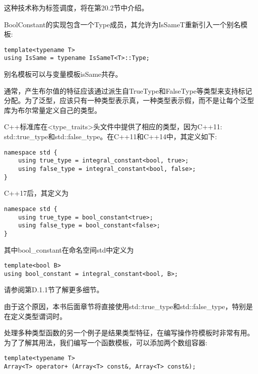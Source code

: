 这种技术称为标签调度，将在第20.2节中介绍。

BoolConstant的实现包含一个Type成员，其允许为IsSameT重新引入一个别名模板:

\begin{lstlisting}[style=styleCXX]
template<typename T>
using IsSame = typename IsSameT<T>::Type;
\end{lstlisting}

别名模板可以与变量模板isSame共存。

通常，产生布尔值的特征应该通过派生自TrueType和FalseType等类型来支持标记分配。为了泛型，应该只有一种类型表示真，一种类型表示假，而不是让每个泛型库为布尔常量定义自己的类型。

C++标准库在<type\_traits>头文件中提供了相应的类型，因为C++11: std::true\_type和std::false\_type。在C++11和C++14中，其定义如下:

\begin{lstlisting}[style=styleCXX]
namespace std {
	using true_type = integral_constant<bool, true>;
	using false_type = integral_constant<bool, false>;
}
\end{lstlisting}

C++17后，其定义为

\begin{lstlisting}[style=styleCXX]
namespace std {
	using true_type = bool_constant<true>;
	using false_type = bool_constant<false>;
}
\end{lstlisting}

其中bool\_constant在命名空间std中定义为

\begin{lstlisting}[style=styleCXX]
template<bool B>
using bool_constant = integral_constant<bool, B>;
\end{lstlisting}

请参阅第D.1.1节了解更多细节。

由于这个原因，本书后面章节将直接使用std::true\_type和std::false\_type，特别是在定义类型谓词时。


处理多种类型函数的另一个例子是结果类型特征，在编写操作符模板时非常有用。为了了解其用法，我们编写一个函数模板，可以添加两个数组容器:

\begin{lstlisting}[style=styleCXX]
template<typename T>
Array<T> operator+ (Array<T> const&, Array<T> const&);
\end{lstlisting}

